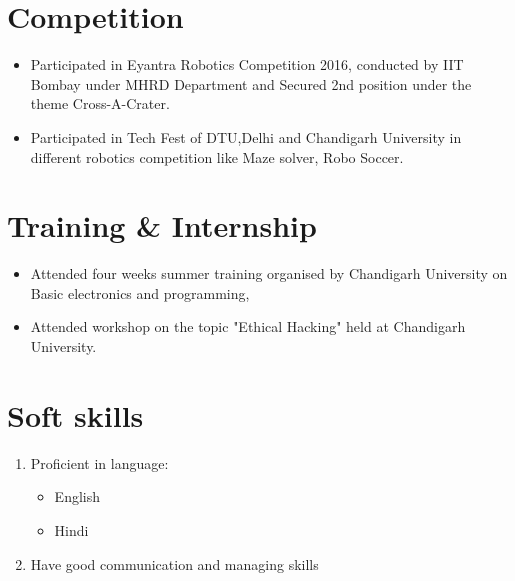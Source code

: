 \documentclass[11pt,a4paper]{article}
\begin{document}
\section*{Competition}
\vspace{-0.7em}\hline \vspace{1.5em}
\begin{itemize}
\item Participated in Eyantra Robotics Competition 2016, conducted by IIT Bombay under MHRD Department and Secured 2nd position under the theme Cross-A-Crater.
\item Participated in Tech Fest of DTU,Delhi and Chandigarh University in different robotics competition like Maze solver, Robo Soccer.
\end{itemize}


\section*{Training \& Internship}
\vspace{-0.7em}\hline \vspace{1.5em}
\begin{itemize}
\item Attended four weeks summer training organised by Chandigarh University on Basic electronics and programming,
\item Attended workshop on the topic "Ethical Hacking" held at Chandigarh University.

\end{itemize}
\section*{Soft skills}
\vspace{-0.7em}\hline \vspace{1.5em}
\begin{enumerate}
\item Proficient in language:
\begin{itemize}
\item English
\item Hindi

\end{itemize}
\item Have good communication and managing skills
\end{enumerate}
\end{document}
